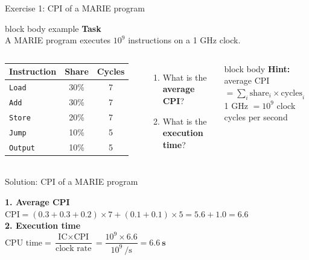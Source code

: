 \documentclass[aspectratio=169,10pt]{beamer}
\newcommand{\taskhead}[2]{%
  \begin{beamercolorbox}[rounded=true,sep=0.12cm,wd=\linewidth]{block body example}
    \small\textbf{#1}\\[0.04cm]
    \footnotesize #2
  \end{beamercolorbox}\vspace{0.1cm}}
\begin{document}
\begin{frame}{Exercise 1: CPI of a MARIE program}
  \taskhead{Task}{A MARIE program executes $10^9$ instructions on a 1 GHz clock.}
  \begin{columns}[c,onlytextwidth]
      \centering
      \small
      \renewcommand{\arraystretch}{1.2}
      \begin{tabular}{lcc}
        \toprule
        Instruction & Share & Cycles \\
        \midrule
        \texttt{Load} & 30\% & 7 \\
        \texttt{Add} & 30\% & 7 \\
        \texttt{Store} & 20\% & 7 \\
        \texttt{Jump} & 10\% & 5 \\
        \texttt{Output} & 10\% & 5 \\
        \bottomrule
      \end{tabular}
      \begin{enumerate}\setlength{\itemsep}{8pt}
        \item What is the \textbf{average CPI}?
        \item What is the \textbf{execution time}?
      \end{enumerate}
      \vspace{0.3cm}
      \begin{beamercolorbox}[rounded=true,sep=0.1cm,wd=\linewidth]{block body}
        \scriptsize\textbf{Hint:} average CPI $= \sum_i \text{share}_i \times \text{cycles}_i$\\[2pt]
        1 GHz $= 10^9$ clock cycles per second
      \end{beamercolorbox}
  \end{columns}
\end{frame}

\begin{frame}{Solution: CPI of a MARIE program}
  \begin{center}
    \small
    \textbf{1. Average CPI}\\[0.15cm]
    $\text{CPI} = (0.3 + 0.3 + 0.2) \times 7 + (0.1 + 0.1) \times 5 = 5.6 + 1.0 = \mathbf{6.6}$\\[0.6cm]
    \textbf{2. Execution time}\\[0.15cm]
    $\text{CPU time} = \dfrac{\text{IC} \times \text{CPI}}{\text{clock rate}}
      = \dfrac{10^9 \times 6.6}{10^9\ \text{/s}} = \mathbf{6.6\ s}$
  \end{center}
\end{frame}
\end{document}

